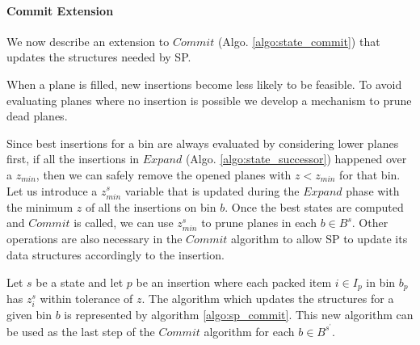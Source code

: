 \paragraph*{Commit Extension}
We now describe an extension to $Commit$ (Algo. \ref{algo:state_commit}) that updates the structures needed by SP.

When a plane is filled, new insertions become less likely to be feasible.
To avoid evaluating planes where no insertion is possible we develop a mechanism to prune dead planes.

Since best insertions for a bin are always evaluated by considering lower planes first, if all the insertions in $Expand$ (Algo. \ref{algo:state_successor}) happened over a $z_{min}$, then we can safely remove the opened planes with $z < z_{min}$ for that bin.
Let us introduce a $z^s_{min}$ variable that is updated during the $Expand$ phase with the minimum $z$ of all the insertions on bin $b$.
Once the best states are computed and $Commit$ is called, we can use $z^s_{min}$ to prune planes in each $b \in B^s$.
Other operations are also necessary in the $Commit$ algorithm to allow SP to update its data structures accordingly to the insertion.

Let $s$ be a state and let $p$ be an insertion where each packed item $i \in I_p$ in bin $b_p$ has $z^s_i$ within tolerance of $z$.
The algorithm which updates the structures for a given bin $b$ is represented by algorithm \ref{algo:sp_commit}.
This new algorithm can be used as the last step of the $Commit$ algorithm for each $b \in B^{s^\prime}$.



